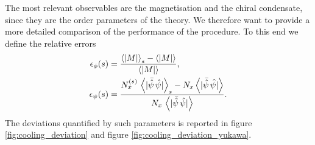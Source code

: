 \newpage
The most relevant observables are the magnetisation and the chiral condensate, since they are the order parameters of the theory. We therefore want to provide a more detailed comparison of the performance of the procedure. To this end we define the relative errors
\begin{equation}
    \begin{aligned}
        \epsilon_\phi(s) &= \frac{\left\langle |M| \right\rangle_{s} - \left\langle |M| \right\rangle}{\left\langle |M| \right\rangle}, \\
        \epsilon_\psi(s) &= \frac{N_x^{(s)} \,\left\langle |\bar{\hat\psi} \, \hat{\psi}| \right\rangle_{s} - N_x\left\langle |\bar{\hat\psi} \, \hat{\psi|} \right\rangle}{N_x \, \left\langle |\bar{\hat\psi} \, \hat{\psi}| \right\rangle}.
    \end{aligned}
    \label{eq:cooling_relative_deviation}
\end{equation}
The deviations quantified by such parameters is reported in figure \ref{fig:cooling_deviation} and  figure \ref{fig:cooling_deviation_yukawa}.
